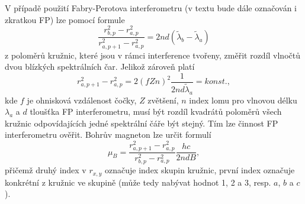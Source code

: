 \documentclass[czech,11pt,a4paper]{article}
\begin{document}
\begin{multicols}{2}
		
		V případě použití Fabry-Perotova interferometru (v textu bude dále označován i zkratkou FP) lze pomocí formule 
		\begin{equation}
			\frac{r_{b, p}^{2}-r_{a, p}^{2}}{r_{a, p+1}^{2}-r_{a, p}^{2}}=2 n d\left(\tilde{\lambda}_{b}-\tilde{\lambda}_{a}\right)
		\end{equation}
		z poloměrů kružnic, které jsou v rámci interference tvořeny, změřit rozdíl vlnočtů dvou blízkých spektrálních čar. Jelikož zároveň platí
		\begin{equation}
			r_{a, p+1}^{2}-r_{a, p}^{2}=2(f Z n)^{2} \frac{1}{2 n d \tilde{\lambda}_{a}} = konst.,
		\end{equation}
		kde $f$ je ohnisková vzdálenost čočky, $Z$ zvětšení, $n$ index lomu pro vlnovou délku $\lambda_{a}$ a $d$ tloušťka FP interferometru, musí být rozdíl kvadrátů poloměrů všech kružnic odpovídajících jedné spektrální čáře být stejný. Tím lze činnost FP interferometru ověřit. 
		Bohrův magneton lze určit formulí 
		\begin{equation}
			\mu _B = \frac{r^2 _{a,p+1}-r^2 _{a,p}}{r^2 _{b,p}-r^2 _{a,p}}\frac{hc}{2ndB},
		\end{equation}
		přičemž druhý index v $r_{x,y}$ označuje index skupin kružnic, první index označuje konkrétní z kružnic ve skupině (může tedy nabývat hodnot 1, 2 a 3, resp. $a$, $b$ a $c$). \newpage
		

\end{multicols}
\end{document}
